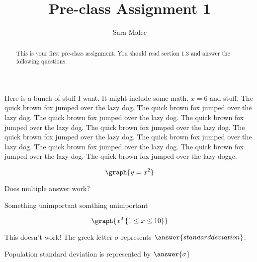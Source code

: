 \documentclass[handout, space]{ximera}
\title{Pre-class Assignment 1}
\author{Sara Malec}
\begin{document}
\begin{abstract}
  This is your first pre-class assignment. You should read section 1.3 and answer the following questions.
\end{abstract}
\maketitle

\begin{leash}{75}
Here is a bunch of stuff I want. It might include some math. $x=6$ and stuff.
The quick brown fox jumped over the lazy dog.
The quick brown fox jumped over the lazy dog.
The quick brown fox jumped over the lazy dog.
The quick brown fox jumped over the lazy dog.
The quick brown fox jumped over the lazy dog.
The quick brown fox jumped over the lazy dog.
The quick brown fox jumped over the lazy dog.
The quick brown fox jumped over the lazy dog.
The quick brown fox jumped over the lazy dog.
The quick brown fox jumped over the lazy doggc.
\end{leash}


\begin{problem}

\[\graph{y=x^2}\]

\end{problem}

\begin{problem} Does multiple answer work?
\begin{selectAll}
\end{selectAll}
\end{problem}

\begin{problem}
\begin{foldable}
 Something unimportant  somthing
unimportant 
\end{foldable}
   \[ 
   \graph{x^2 \left\{ 1 \leq x \leq 10 \right\} }
   \]
\end{problem}

\begin{problem}


    This doesn't work!  The greek letter $\sigma$ represents $\answer{standard deviation}$.
\end{problem}

\begin{problem}
    Population standard deviation is represented by $\answer{\sigma}$
\end{problem}
\end{document}
